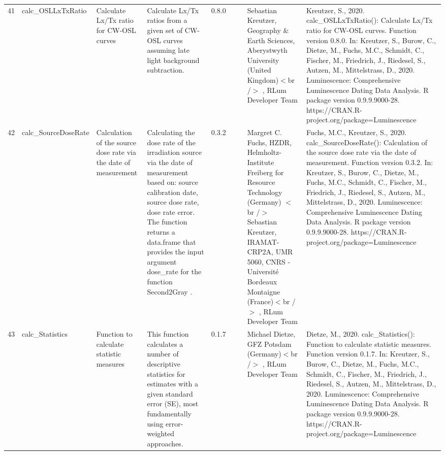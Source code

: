 \begin{table}[ht]
\begin{tabular}{rllllllll}
 \\ 
  41 & calc\_OSLLxTxRatio & Calculate  Lx/Tx  ratio for CW-OSL curves & Calculate  Lx/Tx  ratios from a given set of CW-OSL curves assuming late light background subtraction. & 0.8.0
 &  &  & Sebastian Kreutzer, Geography \& Earth Sciences, Aberystwyth University (United Kingdom)$<$br /$>$ , RLum Developer Team & Kreutzer, S., 2020. calc\_OSLLxTxRatio(): Calculate Lx/Tx ratio for CW-OSL curves. Function version 0.8.0. In: Kreutzer, S., Burow, C., Dietze, M., Fuchs, M.C., Schmidt, C., Fischer, M., Friedrich, J., Riedesel, S., Autzen, M., Mittelstrass, D., 2020. Luminescence: Comprehensive Luminescence Dating Data Analysis. R package version 0.9.9.9000-28. https://CRAN.R-project.org/package=Luminescence
 \\ 
  42 & calc\_SourceDoseRate & Calculation of the source dose rate via the date of measurement & Calculating the dose rate of the irradiation source via the date of measurement based on: source calibration date, source dose rate, dose rate error. The function returns a data.frame that provides the input argument dose\_rate for the function  Second2Gray . & 0.3.2
 &  &  & Margret C. Fuchs, HZDR, Helmholtz-Institute Freiberg for Resource Technology (Germany)  $<$br /$>$ Sebastian Kreutzer, IRAMAT-CRP2A, UMR 5060, CNRS - Université Bordeaux Montaigne (France)$<$br /$>$ , RLum Developer Team & Fuchs, M.C., Kreutzer, S., 2020. calc\_SourceDoseRate(): Calculation of the source dose rate via the date of measurement. Function version 0.3.2. In: Kreutzer, S., Burow, C., Dietze, M., Fuchs, M.C., Schmidt, C., Fischer, M., Friedrich, J., Riedesel, S., Autzen, M., Mittelstrass, D., 2020. Luminescence: Comprehensive Luminescence Dating Data Analysis. R package version 0.9.9.9000-28. https://CRAN.R-project.org/package=Luminescence
 \\ 
  43 & calc\_Statistics & Function to calculate statistic measures & This function calculates a number of descriptive statistics for estimates with a given standard error (SE), most fundamentally using error-weighted approaches. & 0.1.7
 &  &  & Michael Dietze, GFZ Potsdam (Germany)$<$br /$>$ , RLum Developer Team & Dietze, M., 2020. calc\_Statistics(): Function to calculate statistic measures. Function version 0.1.7. In: Kreutzer, S., Burow, C., Dietze, M., Fuchs, M.C., Schmidt, C., Fischer, M., Friedrich, J., Riedesel, S., Autzen, M., Mittelstrass, D., 2020. Luminescence: Comprehensive Luminescence Dating Data Analysis. R package version 0.9.9.9000-28. https://CRAN.R-project.org/package=Luminescence
 \\ 

\end{tabular}
\end{table}

